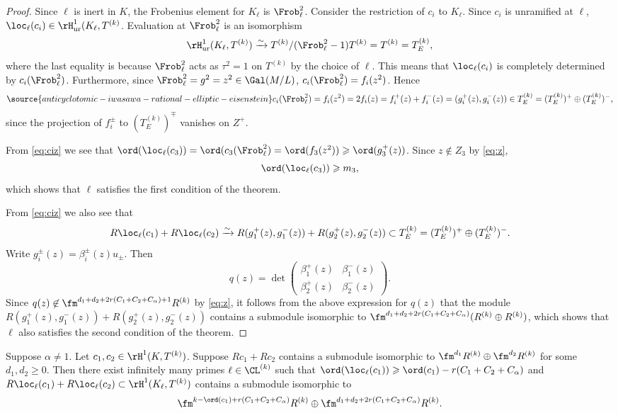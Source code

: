 \begin{proof}
Since $\ell$ is inert in $K$, the Frobenius element for $K_\ell$ is $\Frob_\ell^2$. Consider the restriction of
$c_i$ to $K_\ell$. Since $c_i$ is unramified at $\ell$, $\loc_\ell(c_i)\in \rH^1_{\rm ur}(K_\ell,T^{(k)}$.
Evaluation at $\Frob_\ell^2$ is an isomorphism
$$
\rH^1_{\rm ur}(K_\ell, T^{(k)}) \xrightarrow\sim T^{(k)}/(\Frob_\ell^2-1)T^{(k)} = T^{(k)} = T_E^{(k)},
$$
where the last equality is because $\Frob_\ell^2$ acts as $\tau^2 = 1$ on $T^{(k)}$ by the choice of $\ell$.
This means that $\loc_\ell(c_i)$ is completely determined by $c_i(\Frob_\ell^2)$.
Furthermore, since $\Frob_\ell^2 = g^2  = z^2 \in \Gal(M/L)$, $c_i(\Frob_\ell^2) = f_i(z^2)$. Hence
\begin{equation}\label{eq:ciz}
\source{anticyclotomic-iwasawa-rational-elliptic-eisenstein}
c_i(\Frob_\ell^2) = f_i(z^2) = 2f_i(z) = f_i^+(z) + f_i^-(z) = (g_i^+(z),g_i^-(z)) \in T_E^{(k)} = (T_E^{(k)})^+\oplus (T_E^{(k)})^-,
\end{equation}
since the projection of $f_i^\pm$ to $(T_E^{(k)})^\mp$ vanishes on $Z^+$.

From \eqref{eq:ciz} we see that $\ord(\loc_\ell(c_3)) = \ord(c_3(\Frob_\ell^2) = \ord(f_3(z^2)) \geqslant \ord(g_3^+(z))$.
Since $z\not\in Z_3$ by \eqref{eq:z},
$$
\ord(\loc_\ell(c_3)) \geqslant m_3,
$$
which shows that $\ell$ satisfies the first condition of the theorem.

From \eqref{eq:ciz} we also see that
$$
R\loc_\ell(c_1) + R\loc_\ell(c_2) \xrightarrow\sim R (g_1^+(z),g_1^-(z)) + R(g_2^+(z),g_2^-(z)) \subset T_E^{(k)} = (T_E^{(k)})^+\oplus (T_E^{(k)})^-.
$$
Write $g_i^\pm(z) = \beta_i^\pm(z)u_\pm$. Then
$$
q(z) = \det\left(\begin{matrix}
\beta_1^+(z) & \beta_1^-(z) \\
\beta_2^+(z) & \beta_2^-(z)
\end{matrix}\right).
$$
Since $q(z) \not\in \fm^{d_1+d_2+2r(C_1+C_2+C_\alpha)+1}R^{(k)}$ by \eqref{eq:z}, it follows from the above
expression for $q(z)$ that the module
$R (g_1^+(z),g_1^-(z)) + R(g_2^+(z),g_2^-(z))$ contains a submodule isomorphic to
$\fm^{d_1+d_2+2r(C_1+C_2+C_\alpha)}(R^{(k)}\oplus R^{(k)})$, which shows that $\ell$ also satisfies the
second condition of the theorem.
\end{proof}

\begin{cor}
\notready\label{cor:prime2} Suppose $\alpha\neq 1$.
Let $c_1, c_2 \in \rH^1(K,T^{(k)})$. Suppose $Rc_1 + Rc_2$ contains a submodule isomorphic to
$\fm^{d_1} R^{(k)}\oplus \fm^{d_2} R^{(k)}$ for some $d_1,d_2 \geqslant 0$.
Then there exist infinitely many primes $\ell\in \CL^{(k)}$ such that
$\ord(\loc_\ell(c_1)) \geqslant \ord(c_1) - r(C_1+C_2+C_\alpha)$ and
$R\loc_\ell(c_1) + R \loc_\ell(c_2) \subset \rH^1(K_\ell,T^{(k)})$ contains a
submodule isomorphic to
$$
\fm^{k-\ord(c_1)+r(C_1+C_2+C_\alpha)}R^{(k)} \oplus \fm^{d_1+d_2+2r(C_1+C_2+C_\alpha)}R^{(k)}.
$$
\end{cor}

